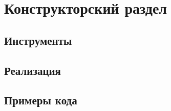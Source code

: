 \chapter{Конструкторский раздел}

\section{Инструменты}
\section{Реализация}
\section{Примеры кода}


